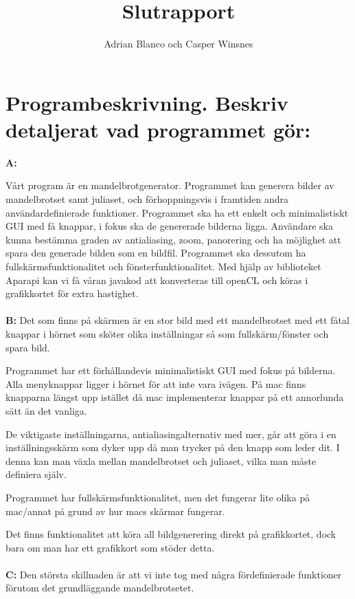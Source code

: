 \documentclass[11pt]{article} %
\title{Slutrapport}
\author{Adrian Blanco och Casper Winsnes}
\begin{document}
\maketitle

\section{Programbeskrivning. Beskriv detaljerat vad programmet gör:}

{\bf A:}

Vårt program är en mandelbrotgenerator. Programmet kan generera bilder av mandelbrotset samt juliaset, och förhoppningsvis i framtiden andra användardefinierade funktioner. Programmet ska ha ett enkelt och minimalistiskt GUI med få knappar, i fokus ska de genererade bilderna ligga.
Användare ska kunna bestämma graden av antialiasing, zoom, panorering och ha möjlighet att spara den generade bilden som en bildfil.
Programmet ska dessutom ha fullskärmsfunktionalitet och fönsterfunktionalitet. Med hjälp av biblioteket Aparapi kan vi få våran javakod att konverteras till openCL och köras i grafikkortet för extra hastighet.
\\
\\
{\bf B:} Det som finns på skärmen är en stor bild med ett mandelbrotset med ett fåtal knappar i hörnet som sköter olika inställningar så som fullskärm/fönster och spara bild. 

Programmet har ett förhållandevis minimalistiskt GUI med fokus på bilderna. Alla menyknappar ligger i hörnet för att inte vara ivägen. På mac finns knapparna längst upp istället då mac implementerar knappar på ett annorlunda sätt än det vanliga.

De viktigaste inställningarna, antialiasingalternativ med mer, går att göra i en \\inställningsskärm som dyker upp då man trycker på den knapp som leder dit. I denna kan man växla mellan mandelbrotset och juliaset, vilka man måste definiera själv.

Programmet har fullskärmsfunktionalitet, men det fungerar lite olika på mac/annat på grund av hur macs skärmar fungerar.

Det finns funktionalitet att köra all bildgenerering direkt på grafikkortet, dock bara om man har ett grafikkort som stöder detta.
\\
\\
{\bf C:} Den största skillnaden är att vi inte tog med några fördefinierade funktioner förutom det grundläggande mandelbrotsetet.
\end{document}

